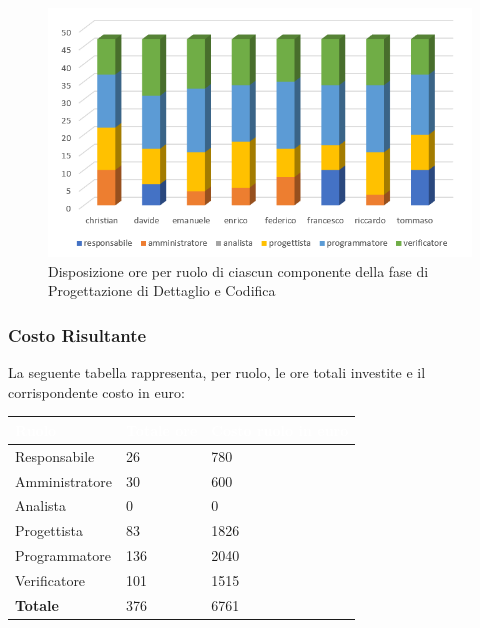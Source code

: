 \begin{figure}[h!]
\centering
\caption{Disposizione ore per ruolo di ciascun componente della fase di Progettazione di Dettaglio e Codifica}
\includegraphics[scale=2.5]{sezioni/Istogrammi/IstogrammaDiDettaglio.png}
\end{figure}

\subsubsection{Costo Risultante}
La seguente tabella rappresenta, per ruolo, le ore totali investite e il corrispondente costo in euro:
{
\renewcommand{\arraystretch}{2}
\begin{table}[h]
\centering
\caption{Tabella del costo risultante della Programmazione di Dettaglio e Codifica}
\begin{longtable}{ C{3cm} C{2cm} C{4cm}}
	\textcolor{white}{\textbf{Ruolo}} & 
	\textcolor{white}{\textbf{Totale ore}} & 
	\textcolor{white}{\textbf{Costo ruolo in euro}}\\	
\endhead
        
        Responsabile & 26 & 780 \\
        Amministratore & 30 & 600 \\
        Analista & 0 & 0 \\
        Progettista & 83 & 1826 \\
        Programmatore & 136 & 2040 \\
        Verificatore & 101 & 1515\\
        \textbf{Totale} & 376 & 6761 \\
		
	\end{longtable}
\end{table}
}


